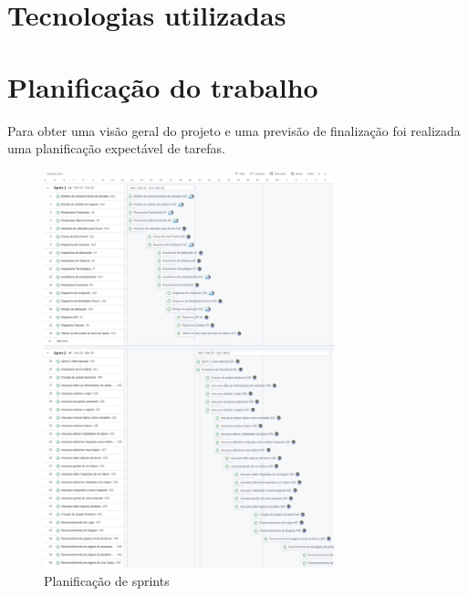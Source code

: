 \newpage

\section{Tecnologias utilizadas}





\newpage



\newpage



\newpage

\section{Planificação do trabalho}\label{sec:planificacao trabalho}

Para obter uma visão geral do projeto e uma previsão de finalização foi realizada uma planificação expectável de tarefas.

\begin{figure}[htb]
  \centering
  
  \includegraphics[width=0.75\textwidth]{images/etapa1_sprint_planning.png}
  \caption{Planificação de sprints}
  \label{fig:1}
\end{figure}



